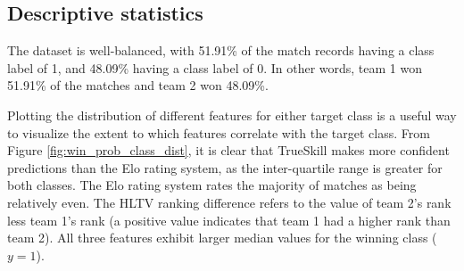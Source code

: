 %
%
%
%



\subsection{Descriptive statistics}

The dataset is well-balanced, with 51.91\% of the match records having a class label of 1, and 48.09\% having a class label of 0. In other words, team 1 won 51.91\% of the matches and team 2 won 48.09\%. 

Plotting the distribution of different features for either target class is a useful way to visualize the extent to which features correlate with the target class. From Figure \ref{fig:win_prob_class_dist}, it is clear that TrueSkill makes more confident predictions than the Elo rating system, as the inter-quartile range is greater for both classes. The Elo rating system rates the majority of matches as being relatively even. The HLTV ranking difference refers to the value of team 2's rank less team 1's rank (a positive value indicates that team 1 had a higher rank than team 2). All three features exhibit larger median values for the winning class ($y=1$).

